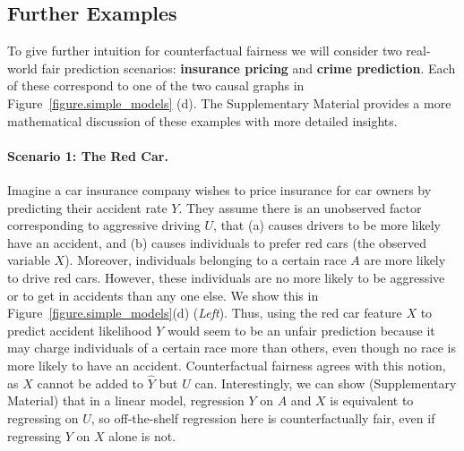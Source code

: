 
\subsection{Further Examples}

To give further intuition for counterfactual fairness we will consider
two real-world fair prediction scenarios: \textbf{insurance pricing}
and \textbf{crime prediction}. Each of these correspond to one of the
two causal graphs in Figure~\ref{figure.simple_models} (d). The
Supplementary Material provides a more mathematical discussion of
these examples with more detailed insights.

\paragraph{Scenario 1: The Red Car.}
Imagine a car insurance company wishes to price insurance for car
owners by predicting their accident rate $Y$. They assume there is an
unobserved factor corresponding to aggressive driving $U$, that (a)
causes drivers to be more likely have an accident, and (b) causes
individuals to prefer red cars (the observed variable $X$). Moreover,
individuals belonging to a certain race $A$ are more likely to drive
red cars. However, these individuals are no more likely to be
aggressive or to get in accidents than any one else. We show this in
Figure~\ref{figure.simple_models}(d) (\emph{Left}). Thus, using the red
car feature $X$ to predict accident likelihood $Y$ would seem to be an
unfair prediction because it may charge individuals of a certain race
more than others, even though no race is more likely to have an
accident. Counterfactual fairness agrees with this notion, as $X$
cannot be added to $\hat Y$ but $U$ can. Interestingly, we can show
(Supplementary Material) that in a linear model, regression $Y$ on
$A$ and $X$ is equivalent to regressing on $U$, so off-the-shelf regression
here is counterfactually fair, even if regressing $Y$ on $X$ alone is not.
%
